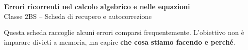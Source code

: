 \documentclass[9pt,a4paper]{extarticle}
\begin{document}
\begin{center}
	{\Large\bfseries Errori ricorrenti nel calcolo algebrico e nelle equazioni}\\[-1pt]
	{\small Classe 2BS -- Scheda di recupero e autocorrezione}
\end{center}

\vspace{-2mm}

{\small
Questa scheda raccoglie alcuni errori comparsi frequentemente.
L'obiettivo non è imparare divieti a memoria, ma capire
\textbf{che cosa stiamo facendo e perché}.
}

\vspace{1mm}

\end{document}
